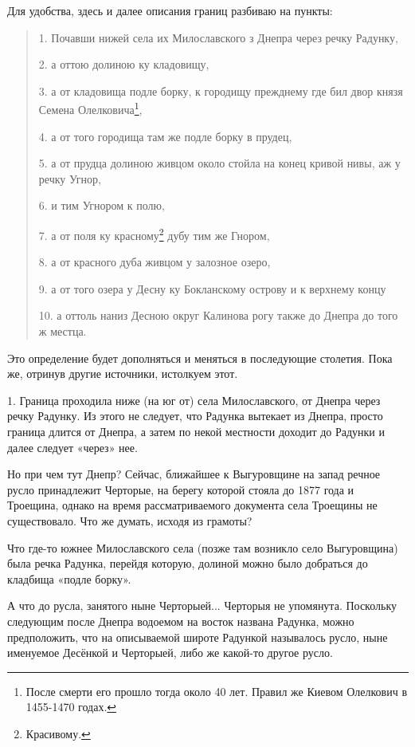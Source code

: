 Для удобства, здесь и далее описания границ разбиваю на пункты:

\begin{quotation}
1. Почавши нижей села их Милославского з Днепра через речку Радунку,

2. а оттою долиною ку кладовищу,

3. а от кладовища подле борку, к городищу прежднему где бил двор князя Семена Олелковича\footnote{После смерти его прошло тогда около 40 лет. Правил же Киевом Олелкович в 1455-1470 годах.}, 

4. а от того городища там же подле борку в прудец,

5. а от прудца долиною живцом около стойла на конец кривой нивы, аж у речку Угнор,

6. и тим Угнором к полю,

7. а от поля ку красному\footnote{Красивому.} дубу тим же Гнором,

8. а от красного дуба живцом у залозное озеро,

9. а от того озера у Десну ку Бокланскому острову и к верхнему концу

10. а оттоль наниз Десною округ Калинова рогу также до Днепра до того ж местца.
\end{quotation}

Это определение будет дополняться и меняться в последующие столетия. Пока же, отринув другие источники, истолкуем этот.

1. Граница проходила ниже (на юг от) села Милославского, от Днепра через речку Радунку. Из этого не следует, что Радунка вытекает из Днепра, просто граница длится от Днепра, а затем по некой местности доходит до Радунки и далее следует «через» нее.

Но при чем тут Днепр? Сейчас, ближайшее к Выгуровщине на запад речное русло принадлежит Черторые, на берегу которой стояла до 1877 года и Троещина, однако на время рассматриваемого документа села Троещины не существовало. Что же думать, исходя из грамоты?

Что где-то южнее Милославского села (позже там возникло село Выгуровщина) была речка Радунка, перейдя которую, долиной можно было добраться до кладбища «подле борку».

А что до русла, занятого ныне Черторыей... Черторыя не упомянута. Поскольку следующим после Днепра водоемом на восток названа Радунка, можно предположить, что на описываемой широте Радункой называлось русло, ныне именуемое Десёнкой и Черторыей, либо же какой-то другое русло.

